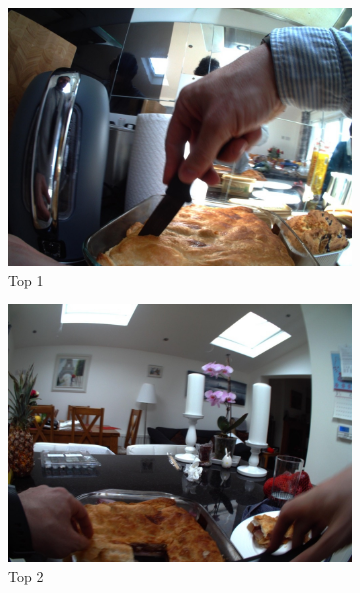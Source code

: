 \newpage

\begin{figure}[H]
    \centering
    \captionsetup{justification=centering}
  
        \begin{subfigure}{0.32\textwidth}
          \includegraphics[width=\textwidth]{Sections/7Results/images/run2top1.jpg} 
          \caption{Top 1}
        \end{subfigure}
        \begin{subfigure}{0.32\textwidth}
          \includegraphics[width=\textwidth]{Sections/7Results/images/run3top2.jpg}\hfill
          \caption{Top 2}
        \end{subfigure}
          \begin{subfigure}{0.32\textwidth}

\end{subfigure}
\end{figure}
